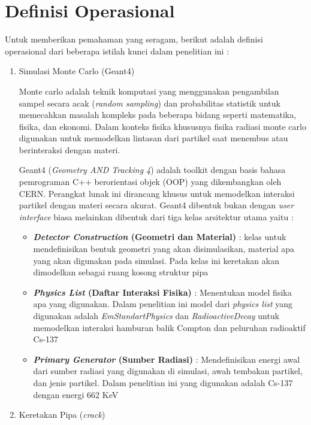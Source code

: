 \documentclass[12pt,a4paper]{report}
\begin{document}
\section{Definisi Operasional}
Untuk memberikan pemahaman yang seragam, berikut adalah definisi operasional dari beberapa istilah kunci dalam penelitian ini : 
\begin{enumerate}
    \item Simulasi Monte Carlo (Geant4)
    
    Monte carlo adalah teknik komputasi yang menggunakan pengambilan sampel secara acak  (\textit{random sampling}) dan probabilitas statistik untuk memecahkan masalah kompleks pada beberapa bidang seperti matematika, fisika, dan ekonomi.
    Dalam konteks fisika khususnya fisika radiasi monte carlo digunakan untuk memodelkan lintasan dari partikel saat menembus atau berinteraksi dengan materi.

    Geant4 (\textit{Geometry AND Tracking 4}) adalah toolkit dengan basis bahasa pemrograman C++ berorientasi objek (OOP) yang dikembangkan oleh CERN. Perangkat lunak ini dirancang khusus untuk memodelkan interaksi partikel dengan materi secara akurat.
    Geant4 dibentuk bukan dengan \textit{user interface} biasa melainkan dibentuk dari tiga kelas arsitektur utama yaitu :
    \begin{itemize}
        \item  \textbf{\textit{Detector Construction} (Geometri dan Material)} : kelas untuk mendefinisikan bentuk geometri yang akan disimulasikan, material apa yang akan digunakan pada simulasi. Pada kelas ini keretakan akan dimodelkan sebagai ruang kosong 
        struktur pipa
        \item \textbf{\textit{Physics List} (Daftar Interaksi Fisika)} : Menentukan model fisika apa yang digunakan. Dalam penelitian ini model dari \textit{physics list} yang digunakan adalah \textit{EmStandartPhysics} dan \textit{RadioactiveDecay} untuk memodelkan 
        interaksi hamburan balik Compton dan peluruhan radioaktif Cs-137
        \item \textbf{\textit{Primary Generator }(Sumber Radiasi)} : Mendefinisikan energi awal dari sumber radiasi yang digunakan di simulasi, awah tembakan partikel, dan jenis partikel. Dalam penelitian ini yang digunakan adalah Cs-137 dengan energi 662 KeV 
    \end{itemize}


    \item Keretakan Pipa (\textit{crack})
    

\end{enumerate}
\end{document}
